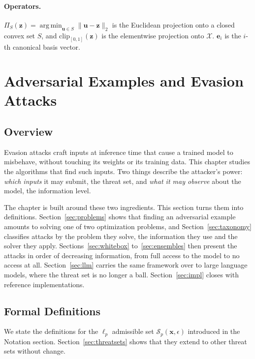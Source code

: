 \documentclass[10pt,a4paper]{extarticle}
\theoremstyle{definition}
\newcommand{\X}{\mathcal{X}}
\newcommand{\x}{\mathbf{x}}
\newcommand{\Proj}{\Pi}
\DeclareMathOperator*{\argmin}{arg\,min}
\begin{document}
\paragraph{Operators.} \(\Proj_S(\mathbf{z})=\argmin_{\mathbf{u}\in S}\|\mathbf{u}-\mathbf{z}\|_2\) is the Euclidean projection onto a closed convex set \(S\), and \(\mathrm{clip}_{[0,1]}(\mathbf{z})\) is the elementwise projection onto \(\X\). \(\mathbf{e}_i\) is the \(i\)-th canonical basis vector.

\section{Adversarial Examples and Evasion Attacks}\label{sec:defs}

\subsection{Overview}

Evasion attacks craft inputs at inference time that cause a trained model to misbehave, without touching its weights or its training data. This chapter studies the algorithms that find such inputs. Two things describe the attacker's power: \emph{which inputs} it may submit, the threat set, and \emph{what it may observe} about the model, the information level.

The chapter is built around these two ingredients. This section turns them into definitions. Section~\ref{sec:problems} shows that finding an adversarial example amounts to solving one of two optimization problems, and Section~\ref{sec:taxonomy} classifies attacks by the problem they solve, the information they use and the solver they apply. Sections~\ref{sec:whitebox} to~\ref{sec:ensembles} then present the attacks in order of decreasing information, from full access to the model to no access at all. Section~\ref{sec:llm} carries the same framework over to large language models, where the threat set is no longer a ball. Section~\ref{sec:impl} closes with reference implementations.

\subsection{Formal Definitions}

We state the definitions for the \(\ell_p\) admissible set \(\mathcal{S}_p(\x,\epsilon)\) introduced in the Notation section. Section~\ref{sec:threatsets} shows that they extend to other threat sets without change.
\end{document}
